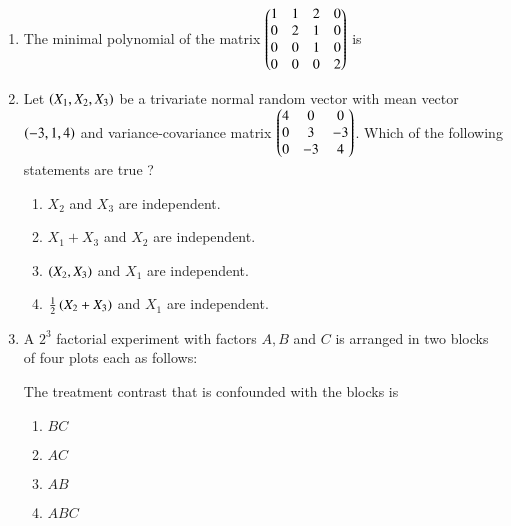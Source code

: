 \documentclass[journal]{IEEEtran}
\begin{document}
\begin{enumerate}
\item The minimal polynomial of the matrix
$\begin{pmatrix}1&1&2&0\\0&2&1&0\\0&0&1&0\\0&0&0&2\\\end{pmatrix}$ is
\begin{enumerate}
\end{enumerate}
\newpage
\item Let $\left(X_1,X_2,X_3\right)$ be a trivariate normal random vector with mean vector $\left(-3,1,4\right)$ and variance-covariance matrix $\begin{pmatrix}4&0&0\\0&3&-3\\0&-3&4\\\end{pmatrix}$. Which of the following statements are true ?
\begin{enumerate}
\item $X_2$ and $X_3$ are independent.
\item $X_1+X_3$ and $X_2$ are independent.
\item $\left(X_2,X_3\right)$ and $X_1$ are independent.
\item $\frac{1}{2}\left(X_2+X_3\right)$ and $X_1$ are independent.
\end{enumerate}
\begin{enumerate}
\end{enumerate}
\item A $2^3$ factorial experiment with factors $A,B$ and $C$ is arranged in  two blocks of four plots each as follows: 
\begin{table}[h]
    \centering
    
    \label{tab:my_label}
\end{table}
The treatment contrast that is confounded with the blocks is
\begin{multicols}{4}
\begin{enumerate}
    \item $BC$
    \item $AC$
    \item $AB$
    \item $ABC$
\end{enumerate}
\end{multicols}


\end{enumerate}
\end{document}

